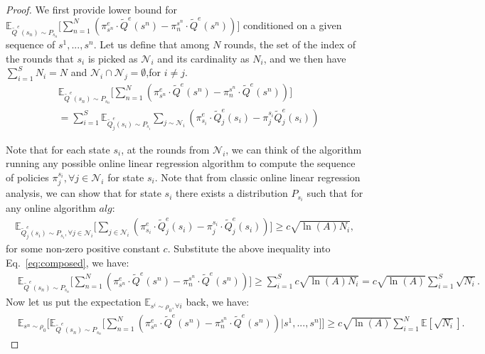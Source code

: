 \begin{proof}
We first provide lower bound for $\mathbb{E}_{\tilde{Q}^e(s_n)\sim P_{s_n}}\big[\sum_{n=1}^N( \pi^e_{s^n} \cdot \tilde{Q}^e(s^n) - \pi_n^{s^n}\cdot \tilde{Q}^e(s^n))\big]$ conditioned on a given sequence of $s^1,...,s^n$.
Let us define that among $N$ rounds, the set of the index of the rounds that $s_i$ is picked as $\mathcal{N}_i$ and its cardinality as $N_i$, and we then have $\sum_{i=1}^S N_i = N$ and $\mathcal{N}_i \cap\mathcal{N}_j = \emptyset$,for $i\neq j$. 
\begin{align}
&\mathbb{E}_{\tilde{Q}^e(s_n)\sim P_{s_n}}\big[\sum_{n=1}^N( \pi^e_{s^n} \cdot \tilde{Q}^e(s^n) - \pi_n^{s^n}\cdot \tilde{Q}^e(s^n))\big] \nonumber\\
& = \sum_{i=1}^S \mathbb{E}_{\tilde{Q}_j^e(s_i)\sim P_{s_i}}\sum_{j\sim \mathcal{N}_i} (\pi_{s_i}^e\cdot\tilde{Q}_j^e(s_i) - \pi_{j}^{s_i}\tilde{Q}_j^e(s_i))
\label{eq:composed}
\end{align}


Note that for each state $s_i$, at the rounds from $\mathcal{N}_i$, we can think of the algorithm running any possible online linear regression algorithm to compute the sequence of policies $\pi_j^{s_i},\forall j\in \mathcal{N}_i$ for state $s_i$. Note that from classic online linear regression analysis, we can show that for state $s_i$ there exists a distribution $P_{s_i}$ such that for any online algorithm $alg$:
\begin{align}
\mathbb{E}_{\tilde{Q}^e_j(s_i)\sim P_{s_i},\forall j\in\mathcal{N}_i}\big[ \sum_{j\in\mathcal{N}_i} (\pi_{s_i}^e \cdot \tilde{Q}_j^e(s_i) - \pi_{j}^{s_i}\cdot \tilde{Q}_j^e(s_i))  \big] \geq c\sqrt{\ln(A) N_i},
\end{align} for some non-zero positive constant $c$.
Substitute the above inequality into Eq.~\ref{eq:composed}, we have:
\begin{align}
&\mathbb{E}_{\tilde{Q}^e(s_n)\sim P_{s_n}}\big[\sum_{n=1}^N( \pi^e_{s^n} \cdot \tilde{Q}^e(s^n) - \pi_n^{s^n}\cdot \tilde{Q}^e(s^n))\big]\geq \sum_{i=1}^S c\sqrt{\ln(A)N_i} = c\sqrt{\ln(A)}\sum_{i=1}^S\sqrt{N_i}.
\end{align}
Now let us put the expectation $\mathbb{E}_{s^i\sim\rho_0,\forall i}$ back, we have:
\begin{align}
\label{eq:fact_1}
&\mathbb{E}_{s^n\sim\rho_0}\Big[\mathbb{E}_{\tilde{Q}^e(s_n)\sim P_{s_n}}\big[\sum_{n=1}^N( \pi^e_{s^n} \cdot \tilde{Q}^e(s^n) - \pi_n^{s^n}\cdot \tilde{Q}^e(s^n))|s^1,...,s^n\big]\Big]\geq  c\sqrt{\ln(A)}\sum_{i=1}^N\mathbb{E}[\sqrt{N_i}].
\end{align}


\end{proof}
